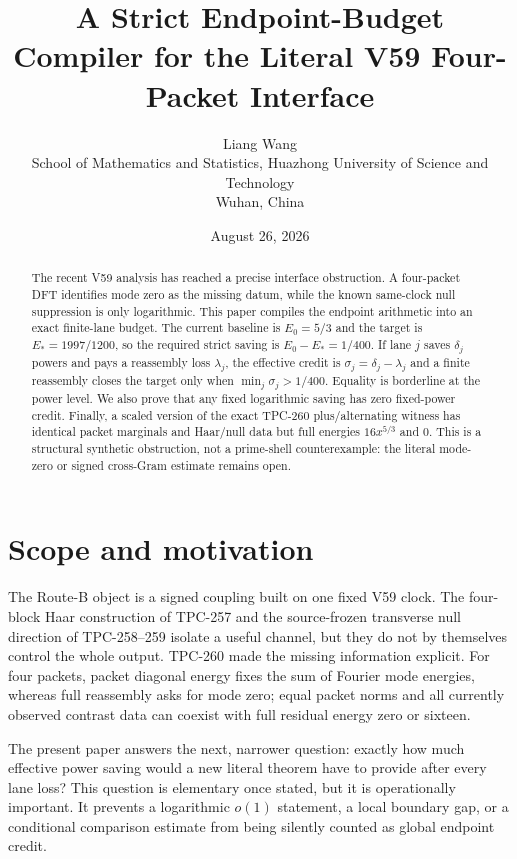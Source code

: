 \documentclass[11pt]{article}
\title{A Strict Endpoint-Budget Compiler for the Literal V59 Four-Packet Interface}
\author{Liang Wang\\
School of Mathematics and Statistics, Huazhong University of Science and Technology\\
Wuhan, China}
\date{August 26, 2026}
\theoremstyle{definition}
\begin{document}
\maketitle

\begin{abstract}
The recent V59 analysis has reached a precise interface obstruction.  A
four-packet DFT identifies mode zero as the missing datum, while the known
same-clock null suppression is only logarithmic.  This paper compiles the
endpoint arithmetic into an exact finite-lane budget.  The current baseline is
$E_0=5/3$ and the target is $E_*=1997/1200$, so the required strict saving is
$E_0-E_*=1/400$.  If lane $j$ saves $\delta_j$ powers and pays a reassembly loss
$\lambda_j$, the effective credit is $\sigma_j=\delta_j-\lambda_j$ and a finite
reassembly closes the target only when $\min_j\sigma_j>1/400$.  Equality is
borderline at the power level.  We also prove that any fixed logarithmic saving
has zero fixed-power credit.  Finally, a scaled version of the exact TPC-260
plus/alternating witness has identical packet marginals and Haar/null data but
full energies $16x^{5/3}$ and $0$.  This is a structural synthetic obstruction,
not a prime-shell counterexample: the literal mode-zero or signed cross-Gram
estimate remains open.
\end{abstract}

\section{Scope and motivation}

The Route-B object is a signed coupling built on one fixed V59 clock.  The
four-block Haar construction of TPC-257 and the source-frozen transverse null
direction of TPC-258--259 isolate a useful channel, but they do not by
themselves control the whole output.  TPC-260 made the missing information
explicit.  For four packets, packet diagonal energy fixes the sum of Fourier
mode energies, whereas full reassembly asks for mode zero; equal packet norms
and all currently observed contrast data can coexist with full residual energy
zero or sixteen.

The present paper answers the next, narrower question: exactly how much
effective power saving would a new literal theorem have to provide after every
lane loss?  This question is elementary once stated, but it is operationally
important.  It prevents a logarithmic $o(1)$ statement, a local boundary gap,
or a conditional comparison estimate from being silently counted as global
endpoint credit.
\end{document}
